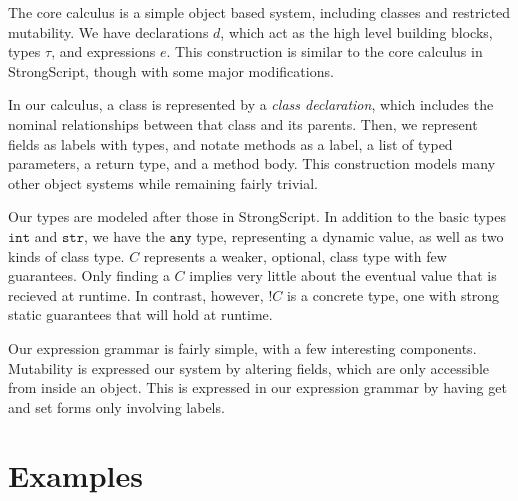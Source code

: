 \documentclass{sigplanconf}
\newcommand{\strt}{\texttt{str}}
\newcommand{\intt}{\texttt{int}}
\newcommand{\anyt}{\texttt{any}}
\begin{document}
The core calculus is a simple object based system, including classes and 
restricted mutability. We have declarations $d$, which act as the high level 
building blocks, types $\tau$, and expressions $e$. This construction is 
similar to the core calculus in StrongScript, though with some major 
modifications.

In our calculus, a class is represented by a \emph{class declaration}, which 
includes the nominal relationships between that class and its parents. Then, we 
represent fields as labels with types, and notate methods as a label, a list 
of typed parameters, a return type, and a method body. This construction models 
many other object systems while remaining fairly trivial.

Our types are modeled after those in StrongScript. In addition to the basic 
types $\intt$ and $\strt$, we have the $\anyt$ type, representing a dynamic 
value, as well as two kinds of class type. $C$ represents a weaker, optional, 
class type with few guarantees. Only finding a $C$ implies very little about 
the eventual value that is recieved at runtime. In contrast, however, $!C$ is 
a concrete type, one with strong static guarantees that will hold at runtime. 

Our expression grammar is fairly simple, with a few interesting components. 
Mutability is expressed our system by altering fields, which are only 
accessible from inside an object. This is expressed in our expression
grammar by having get and set forms only involving labels. 

\section{Examples}
\end{document}
